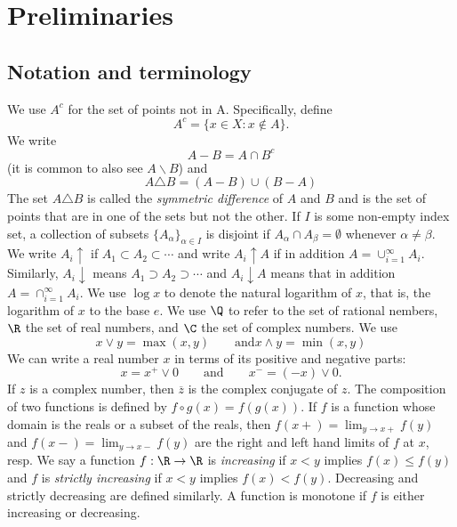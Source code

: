 \begin{sloppypar}
\chapter{Preliminaries}
\section{Notation and terminology}
We use $A^c$ for the set of points not in A. Specifically, define
$$A^c = \lbrace x \in X : x \notin A \rbrace . $$
We write
$$A - B = A \cap B^c $$ 
(it is common to also see $A \backslash B$) and
$$A \triangle B = (A - B) \cup (B-A) $$
\indent The set $A \triangle B$ is called the \textit{symmetric difference} of $A$ and $B$ and is the set of points that are in one of the sets but not the other. If $I$ is some non-empty index set, a collection of subsets $\lbrace A_{\alpha} \rbrace_{\alpha \in I}$ is disjoint if $A_\alpha \cap A_\beta = \emptyset$ whenever $\alpha \neq \beta$.
\newline \indent We write $A_i \uparrow$ if $A_1 \subset A_2 \subset \cdots$ and write $A_i \uparrow A$ if in addition $A = \cup^{\infty}_{i=1} A_i$. Similarly, $A_i \downarrow$ means $A_1 \supset A_2 \supset \cdots$ and $A_i \downarrow A$ means that in addition $A = \cap^{\infty}_{i=1} A_i$.
\newline \indent We use $\log x$ to denote the natural logarithm of $x$, that is, the logarithm of $x$ to the base $e$.
\newline \indent We use $\Q$ to refer to the set of rational nembers, $\R$ the set of real numbers, and $\C$ the set of complex numbers. We use
$$x \vee y = \max(x,y) \qquad \text{and} x \wedge y = \min(x,y)$$
We can write a real number $x$ in terms of its positive and negative parts: $$x = x^+ \vee 0 \qquad \text{and} \qquad x^- = (-x) \vee 0.$$
If $z$ is a complex number, then $\overline{z}$ is the complex conjugate of $z$. The composition of two functions is defined by $f \circ g(x) = f(g(x))$.
\newline \indent If $f$ is a function whose domain is the reals or a subset of the reals, then $f(x+) = \lim_{y \rightarrow x+} f(y)$ and $f(x-) = \lim_{y \rightarrow x-} f(y)$ are the right and left hand limits of $f$ at $x$, resp.
\newline \indent We say a function $f: \R \rightarrow \R$ is \textit{increasing} if $x < y$ implies $f(x) \leq f(y)$ and $f$ is \textit{strictly increasing} if $x < y$ implies $f(x) < f(y)$. Decreasing and strictly decreasing are defined similarly. A function is monotone if $f$ is either increasing or decreasing.

\end{sloppypar}
